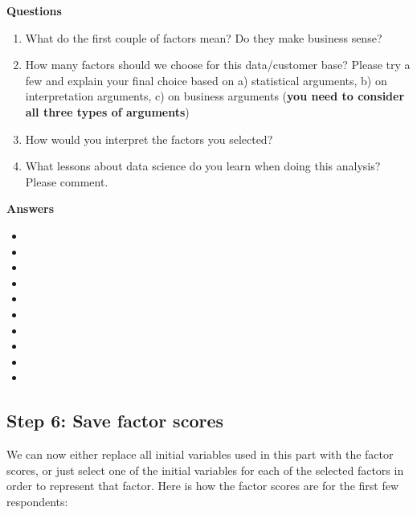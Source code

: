 \documentclass[
]{article}
\makeatletter
\def\maxheight{\ifdim\Gin@nat@height>\textheight\textheight\else\Gin@nat@height\fi}
\providecommand{\tightlist}{%
  \setlength{\itemsep}{0pt}\setlength{\parskip}{0pt}}
\makeatother
\begin{document}
\textbf{Questions}

\begin{enumerate}
\def\labelenumi{\arabic{enumi}.}
\tightlist
\item
  What do the first couple of factors mean? Do they make business sense?
\item
  How many factors should we choose for this data/customer base? Please
  try a few and explain your final choice based on a) statistical
  arguments, b) on interpretation arguments, c) on business arguments
  (\textbf{you need to consider all three types of arguments})
\item
  How would you interpret the factors you selected?
\item
  What lessons about data science do you learn when doing this analysis?
  Please comment.
\end{enumerate}

\textbf{Answers}

\begin{itemize}
\tightlist
\item
\item
\item
\item
\item
\item
\item
\item
\item
\item
\end{itemize}

\hypertarget{step-6-save-factor-scores}{%
\subsection{Step 6: Save factor
scores}\label{step-6-save-factor-scores}}

We can now either replace all initial variables used in this part with
the factor scores, or just select one of the initial variables for each
of the selected factors in order to represent that factor. Here is how
the factor scores are for the first few respondents:

\setkeys{Gin}{height=\maxheight}
\end{document}
